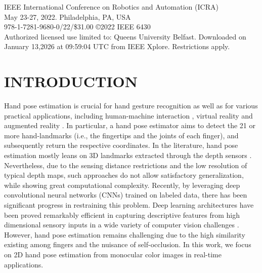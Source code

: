 \documentclass[11pt]{article}
\begin{document}
 IEEE International Conference on Robotics and Automation (ICRA)\\
May 23-27, 2022. Philadelphia, PA, USA\\
978-1-7281-9680-0/22/\$31.00 \copyright{}2022 IEEE 6430\\
Authorized licensed use limited to: Queens University Belfast. Downloaded on January 13,2026 at 09:59:04 UTC from IEEE Xplore. Restrictions apply.

\section{INTRODUCTION}
Hand pose estimation is crucial for hand gesture recognition as well as for various practical applications, including human-machine interaction \cite{ref5,ref6,ref7,ref8,ref9}, virtual reality \cite{ref10,ref11,ref12,ref13} and augmented reality \cite{ref14,ref15,ref16}. In particular, a hand pose estimator aims to detect the 21 or more hand-landmarks (i.e., the fingertips and the joints of each finger), and subsequently return the respective coordinates. In the literature, hand pose estimation mostly leans on 3D landmarks extracted through the depth sensors \cite{ref17,ref18,ref19,ref20,ref21,ref22}. Nevertheless, due to the sensing distance restrictions and the low resolution of typical depth maps, such approaches do not allow satisfactory generalization, while showing great computational complexity.
Recently, by leveraging deep convolutional neural networks (CNNs) trained on labeled data, there has been significant progress in restraining this problem. Deep learning architectures have been proved remarkably efficient in capturing descriptive features from high dimensional sensory inputs in a wide variety of computer vision challenges \cite{ref23,ref24}. However, hand pose estimation remains challenging due to the high similarity existing among fingers and the nuisance of self-occlusion. In this work, we focus on 2D hand pose estimation from monocular color images in real-time applications.
\end{document}
